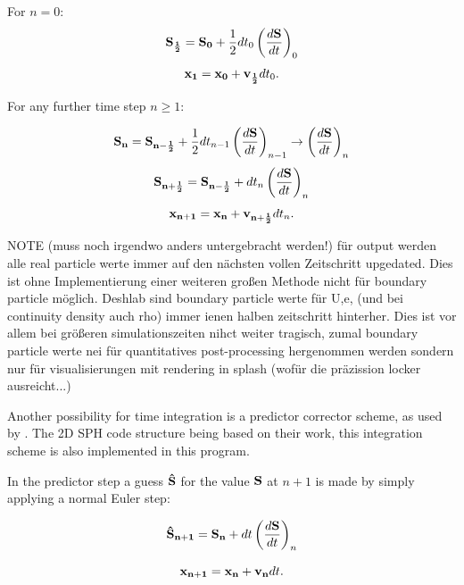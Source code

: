\documentclass{report}
\begin{document}
For $n=0$:
\begin{equation}
{\bf S_{\frac{1}{2}}}={\bf S_0}+\frac{1}{2}dt_0\left(\frac{d{\bf S}}{dt}\right)_0
\end{equation}
\begin{equation}
{\bf x_1}={\bf x_0}+{\bf v_{\frac{1}{2}}}dt_0 .
\end{equation}

For any further time step $n\ge1$:

\begin{equation}
{\bf S_n}={\bf S_{n-\frac{1}{2}}}+\frac{1}{2}dt_{n-1}\left(\frac{d{\bf S}}{dt}\right)_{n-1} \rightarrow
\left(\frac{d{\bf S}}{dt}\right)_n 
\end{equation}
\begin{equation}
{\bf S_{n+\frac{1}{2}}}={\bf S_{n-\frac{1}{2}}}+dt_n\left(\frac{d{\bf S}}{dt}\right)_n 
\end{equation}
\begin{equation}
{\bf x_{n+1}}={\bf x_n}+{\bf v_{n+\frac{1}{2}}}dt_n .
\end{equation}

NOTE (muss noch irgendwo anders untergebracht werden!) für output werden alle real particle werte immer auf den nächsten vollen Zeitschritt upgedated. Dies ist ohne Implementierung einer weiteren großen Methode nicht für boundary particle möglich. Deshlab sind boundary particle werte für U,e, (und bei continuity density auch rho) immer ienen halben zeitschritt hinterher. Dies ist vor allem bei größeren simulationszeiten nihct weiter tragisch, zumal boundary particle werte nei für quantitatives post-processing hergenommen werden sondern nur für visualisierungen mit rendering in splash (wofür die präzission locker ausreicht...)

Another possibility for time integration is a predictor corrector scheme, as
used by \cite{Hu2007}.
The 2D SPH code structure being based on their work,
this integration scheme is also implemented in this program.

In the predictor step a guess ${\bf \hat S}$ for the value ${\bf S}$ at $n+1$ is made by simply
applying a normal Euler step:

\begin{equation}
{\bf \hat S_{n+1}}={\bf S_n}+dt\left(\frac{d{\bf S}}{dt}\right)_n
\end{equation}

\begin{equation}
{\bf x_{n+1}}={\bf x_n}+ {\bf v_{n}}dt.
\end{equation}
\end{document}
